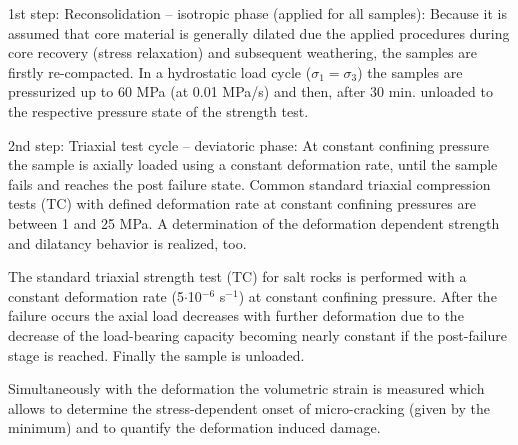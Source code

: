 \begin{list}{-}{\leftmargin=1em \itemindent=0em \itemsep=0.2em}
\item 1st step: Reconsolidation – isotropic phase (applied for all samples): Because it is assumed that core material is generally dilated due the applied procedures during core recovery (stress relaxation) and subsequent weathering, the samples are firstly re-compacted. In a hydrostatic load cycle ($\sigma_1 = \sigma_3$) the samples are pressurized up to 60 MPa (at 0.01 MPa/s) and then, after 30 min. unloaded to the respective pressure state of the strength test.
\item 2nd step: Triaxial test cycle – deviatoric phase:  At constant confining pressure the sample is axially loaded using a constant deformation rate, until the sample fails and reaches the post failure state. Common standard triaxial compression tests (TC) with defined deformation rate at constant confining pressures are between 1 and 25 MPa. A determination of the deformation dependent strength and dilatancy behavior is realized, too.
\end{list}

The standard triaxial strength test (TC) for salt rocks is performed with a constant deformation rate 
(5$\cdot$10$^{-6}$ s$^{-1}$) at constant confining pressure. After the failure occurs the axial load decreases with further deformation due to the decrease of the load-bearing capacity becoming nearly constant if the post-failure stage is reached. Finally the sample is unloaded.

Simultaneously with the deformation the volumetric strain is measured which allows to determine the 
stress-dependent onset of micro-cracking (given by the minimum) and to quantify the deformation induced damage.


